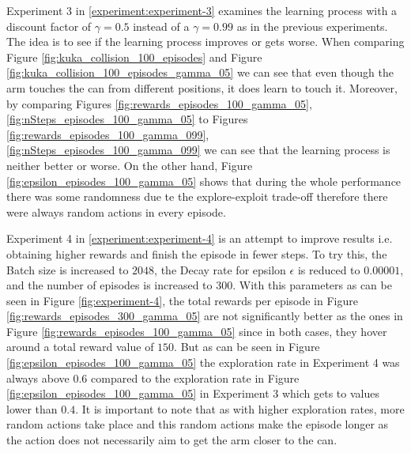 \documentclass[12pt,oneside]{article}
\begin{document}
Experiment 3 in \ref{experiment:experiment-3} examines the learning process with a discount factor of $\gamma = 0.5$ instead of a $\gamma = 0.99$ as in the previous experiments. The idea is to see if the learning process improves or gets worse. When comparing Figure \ref{fig:kuka_collision_100_episodes} and Figure \ref{fig:kuka_collision_100_episodes_gamma_05} we can see that even though the arm touches the can from different positions, it does learn to touch it. Moreover, by comparing Figures \ref{fig:rewards_episodes_100_gamma_05}, \ref{fig:nSteps_episodes_100_gamma_05} to Figures  \ref{fig:rewards_episodes_100_gamma_099}, \ref{fig:nSteps_episodes_100_gamma_099} we can see that the learning process is neither better or worse. On the other hand, Figure \ref{fig:epsilon_episodes_100_gamma_05} shows that during the whole performance there was some randomness due te the explore-exploit trade-off therefore there were always random actions in every episode.

Experiment 4 in \ref{experiment:experiment-4} is an attempt to improve results i.e. obtaining higher rewards and finish the episode in fewer steps. To try this, the Batch size is increased to $2048$, the Decay rate for epsilon $\epsilon$ is reduced to $0.00001$, and the number of episodes is increased to $300$. With this parameters as can be seen in Figure \ref{fig:experiment-4}, the total rewards per episode in Figure \ref{fig:rewards_episodes_300_gamma_05} are not significantly better as the ones in Figure \ref{fig:rewards_episodes_100_gamma_05} since in both cases, they hover around a total reward value of $150$. But as can be seen in Figure \ref{fig:epsilon_episodes_100_gamma_05} the exploration rate in Experiment 4 was always above $0.6$ compared to the exploration rate in Figure \ref{fig:epsilon_episodes_100_gamma_05} in Experiment 3 which gets to values lower than $0.4$. It is important to note that as with higher exploration rates, more random actions take place and this random actions make the episode longer as the action does not necessarily aim to get the arm closer to the can. 
\end{document}
